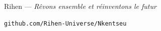 \vspace{22pt}

\begin{center}
{\sffamily\footnotesize\color{grisTexte}
Rihen --- \emph{Rêvons ensemble et réinventons le futur}\par}
\vspace{3pt}
{\sffamily\footnotesize\color{grisTexte}
\texttt{github.com/Rihen-Universe/Nkentseu}\par}
\end{center}

\vfill
\clearpage
